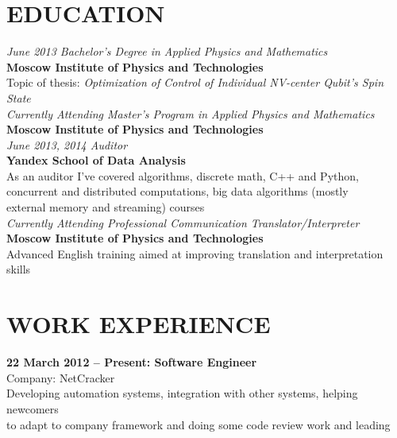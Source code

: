 \documentclass[margin,12pt]{res}
\begin{document}
  \address{28a Pervomayskaya Street, Dolgoprudny, Russian Federation\\
    kremsnx@gmail.com\\
    valery.ovchinnikov@phystech.edu\\
    +7 (985) 9-64-8-512}

\begin{resume}
\section{EDUCATION} 
\textit{June 2013 Bachelor's Degree in Applied Physics and Mathematics\\}
\textbf{Moscow Institute of Physics and Technologies}\\
Topic of thesis: \textit{Optimization of Control of Individual NV-center Qubit's Spin State}\\
\newline
\textit{Currently Attending Master's Program in Applied Physics and Mathematics\\}
\textbf{Moscow Institute of Physics and Technologies}\\
\newline
\textit{June 2013, 2014 Auditor\\}
\textbf{Yandex School of Data Analysis}\\
As an auditor I've covered algorithms, discrete math, C++ and Python,\\
 concurrent and distributed computations, big data algorithms (mostly\\
 external memory and streaming) courses\\
\newline
\textit{Currently Attending Professional Communication Translator/Interpreter\\}
\textbf{Moscow Institute of Physics and Technologies}\\
Advanced English training aimed at improving translation and
interpretation skills
\section{WORK EXPERIENCE} 
\textbf{22 March 2012 -- Present: Software Engineer}\\
Company: NetCracker\\
Developing automation systems, integration with other systems, helping newcomers\\
 to adapt to company framework and doing some code review work and leading

\end{resume}
\end{document}
